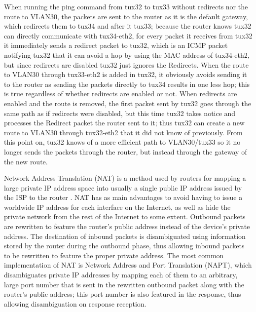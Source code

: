 \documentclass[a4paper, 11pt]{report}
\begin{document}
When running the ping command from tux32 to tux33 without redirects nor the route to VLAN30, the packets are sent to the router as it is the default gateway, which redirects them to tux34 and after it tux33; because the router knows tux32 can directly communicate with tux34-eth2, for every packet it receives from tux32 it immediately sends a redirect packet to tux32, which is an ICMP packet notifying tux32 that it can avoid a hop by using the MAC address of tux34-eth2, but since redirects are disabled tux32 just ignores the Redirects.
When the route to VLAN30 through tux33-eth2 is added in tux32, it obviously avoids sending it to the router as sending the packets directly to tux34 results in one less hop; this is true regardless of whether redirects are enabled or not.
When redirects are enabled and the route is removed, the first packet sent by tux32 goes through the same path as if redirects were disabled, but this time tux32 takes notice and processes the Redirect packet the router sent to it; thus tux32 can create a new route to VLAN30 through tux32-eth2 that it did not know of previously. From this point on, tux32 knows of a more efficient path to VLAN30/tux33 so it no longer sends the packets through the router, but instead through the gateway of the new route.

Network Address Translation (NAT) is a method used by routers for mapping a large private IP address space into usually a single public IP address issued by the ISP to the router \cite{rfc2663}.
NAT has as main advantages to avoid having to issue a worldwide IP address for each interface on the Internet, as well as hide the private network from the rest of the Internet to some extent.
Outbound packets are rewritten to feature the router's public address instead of the device's private address.
The destination of inbound packets is disambiguated using information stored by the router during the outbound phase, thus allowing inbound packets to be rewritten to feature the proper private address.
The most common implementation of NAT is Network Address and Port Translation (NAPT), which disambiguates private IP addresses by mapping each of them to an arbitrary, large port number that is sent in the rewritten outbound packet along with the router's public address; this port number is also featured in the response, thus allowing disambiguation on response reception.
\end{document}
